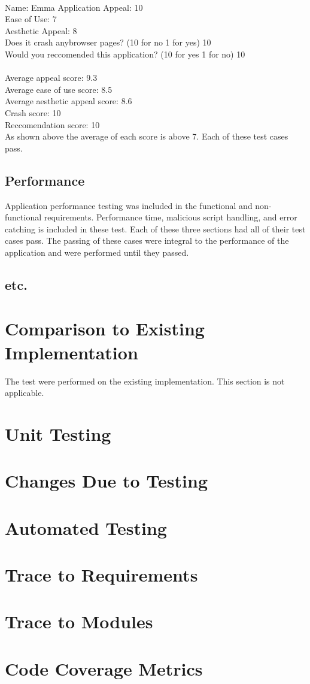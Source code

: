 \documentclass[12pt, titlepage]{article}
\begin{document}
\\
Name: Emma
Application Appeal: 10 \\ 
Ease of Use: 7\\ 
Aesthetic Appeal: 8\\ 
Does it crash anybrowser pages? (10 for no 1 for yes) 10\\ 
Would you reccomended this application? (10 for yes 1 for no) 10\\ 
\\
Average appeal score:  9.3
\\
Average ease of use score: 8.5
\\
Average aesthetic appeal score: 8.6
\\
Crash score: 10
\\
Reccomendation score: 10
\\
As shown above the average of each score is above 7. Each of these test cases pass.
\subsection{Performance}
Application performance testing was included in the functional and non-functional requirements. Performance time, malicious script handling, and error catching is included in these test. Each of these three sections had all of their test cases pass. The passing of these cases were integral to the performance of the application and were performed until they passed. 
\subsection{etc.}
	
\section{Comparison to Existing Implementation}	
The test were performed on the existing implementation. This section is not applicable.
\section{Unit Testing}
\section{Changes Due to Testing}
\section{Automated Testing}
		
\section{Trace to Requirements}
		
\section{Trace to Modules}
		
\section{Code Coverage Metrics}
\end{document}
